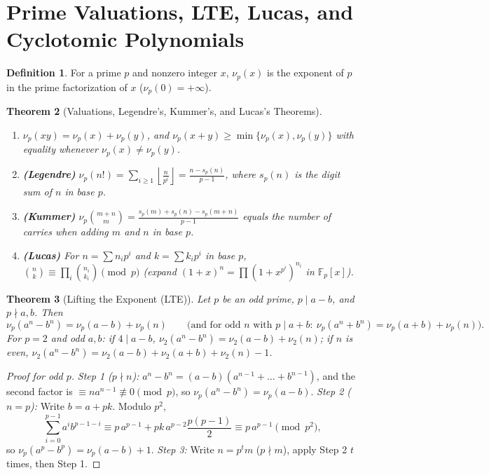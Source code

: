 \documentclass[11pt]{article}
\theoremstyle{plain}
\newtheorem{theorem}{Theorem}[section]
\theoremstyle{definition}
\newtheorem{definition}[theorem]{Definition}
\newcommand{\FF}{\mathbb{F}}
\begin{document}
\section{Prime Valuations, LTE, Lucas, and Cyclotomic Polynomials}\label{sec:valuations}

\begin{definition}
For a prime $p$ and nonzero integer $x$, $\nu_p(x)$ is the exponent of $p$ in
the prime factorization of $x$ ($\nu_p(0) = +\infty$).
\end{definition}

\begin{theorem}[Valuations, Legendre's, Kummer's, and Lucas's Theorems]
\leavevmode
\begin{enumerate}[label=(\alph*)]
\item $\nu_p(xy) = \nu_p(x)+\nu_p(y)$, and $\nu_p(x + y) \ge \min\{\nu_p(x), \nu_p(y)\}$ with \emph{equality} whenever $\nu_p(x) \ne \nu_p(y)$.
\item \textbf{(Legendre)} $\displaystyle \nu_p(n!) = \sum_{i \ge 1}\left\lfloor \frac{n}{p^i}\right\rfloor = \frac{n - s_p(n)}{p-1}$, where $s_p(n)$ is the digit sum of $n$ in base $p$.
\item \textbf{(Kummer)} $\nu_p\binom{m+n}{m} = \frac{s_p(m)+s_p(n)-s_p(m+n)}{p-1}$ equals the number of carries when adding $m$ and $n$ in base $p$.
\item \textbf{(Lucas)} For $n = \sum n_i p^i$ and $k = \sum k_i p^i$ in base $p$, $\binom{n}{k} \equiv \prod_i \binom{n_i}{k_i} \pmod p$ (expand $(1+x)^n = \prod (1+x^{p^i})^{n_i}$ in $\FF_p[x]$).
\end{enumerate}
\end{theorem}

\begin{theorem}[Lifting the Exponent (LTE)]
Let $p$ be an odd prime, $p \mid a - b$, and $p \nmid a, b$. Then
\[
\nu_p(a^n - b^n) = \nu_p(a - b) + \nu_p(n) \qquad \bigl(\text{and for odd } n \text{ with } p\mid a+b:\ \nu_p(a^n+b^n) = \nu_p(a+b) + \nu_p(n)\bigr).
\]
For $p = 2$ and odd $a, b$: if $4 \mid a - b$, $\nu_2(a^n - b^n) = \nu_2(a-b) + \nu_2(n)$;
if $n$ is even, $\nu_2(a^n-b^n) = \nu_2(a-b) + \nu_2(a+b) + \nu_2(n) - 1$.
\end{theorem}
\begin{proof}[Proof for odd $p$]
\emph{Step 1 ($p \nmid n$):} $a^n - b^n = (a-b)(a^{n-1} + \dots + b^{n-1})$, and the second factor is $\equiv n a^{n-1} \not\equiv 0 \pmod p$, so $\nu_p(a^n - b^n) = \nu_p(a-b)$.
\emph{Step 2 ($n = p$):} Write $b = a + pk$. Modulo $p^2$,
\[
\sum_{i=0}^{p-1} a^i b^{p-1-i} \equiv p\,a^{p-1} + pk\,a^{p-2}\frac{p(p-1)}{2} \equiv p\,a^{p-1} \pmod{p^2},
\]
so $\nu_p(a^p - b^p) = \nu_p(a-b) + 1$.
\emph{Step 3:} Write $n = p^t m$ ($p \nmid m$), apply Step 2 $t$ times, then Step 1.
\end{proof}
\end{document}
